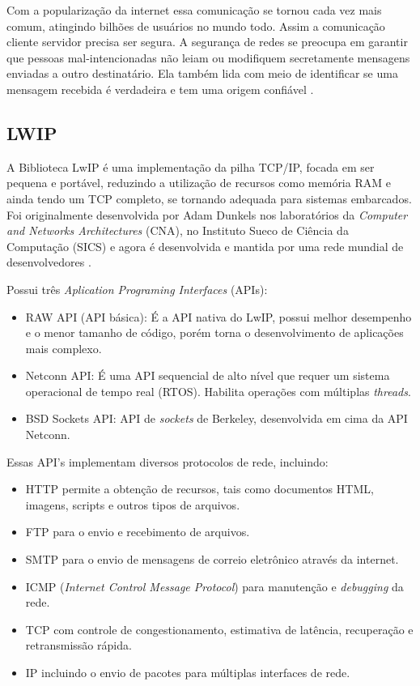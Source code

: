 Com a popularização da internet essa comunicação se tornou cada vez mais comum, atingindo bilhões de usuários no mundo todo. Assim a comunicação cliente servidor precisa ser segura. A segurança de redes se preocupa em garantir que pessoas mal-intencionadas não leiam ou modifiquem secretamente mensagens enviadas a outro destinatário. Ela também lida com meio de identificar se uma mensagem recebida é verdadeira e tem uma origem confiável \cite{tanenbaumRedes}.



\subsection{LWIP}
A Biblioteca LwIP é uma implementação da pilha TCP/IP, focada em ser pequena e portável, reduzindo a utilização de recursos como memória RAM e ainda tendo um TCP completo, se tornando adequada para sistemas embarcados. Foi originalmente desenvolvida por Adam Dunkels nos laboratórios da \textit{Computer and Networks Architectures} (CNA), no Instituto Sueco de Ciência da Computação (SICS) e agora é desenvolvida e mantida por uma rede mundial de desenvolvedores \cite{LWIP}.

Possui três \textit{Aplication Programing Interfaces} (APIs):
\begin{itemize}
\item RAW API (API básica): É a API nativa do LwIP, possui melhor desempenho e o menor tamanho de código, porém torna o desenvolvimento de aplicações mais complexo.
\item Netconn API: É uma API sequencial de alto nível que requer um sistema operacional de tempo real (RTOS). Habilita operações com múltiplas \textit{threads}.
\item BSD Sockets API: API de \textit{sockets} de Berkeley, desenvolvida em cima da API Netconn.
\end{itemize}

Essas API's implementam diversos protocolos de rede, incluindo:
\begin{itemize}
    \item HTTP permite a obtenção de recursos, tais como documentos HTML, imagens, scripts e outros tipos de arquivos.
    \item FTP para o envio e recebimento de arquivos.
    \item SMTP para o envio de mensagens de correio eletrônico através da internet.
    \item ICMP (\textit{Internet Control Message Protocol}) para manutenção e \textit{debugging} da rede.
    \item TCP com controle de congestionamento, estimativa de latência, recuperação e retransmissão rápida.
    \item IP incluindo o envio de pacotes para múltiplas interfaces de rede. \newline
    
 
    
\end{itemize} 

